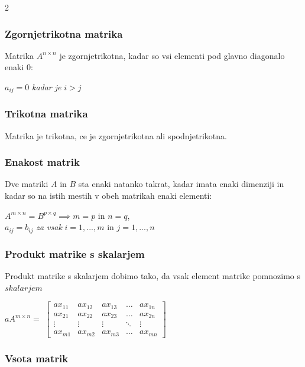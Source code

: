 \documentclass{article}
\begin{document}
\begin{multicols}{2}
	\subsubsection{Zgornjetrikotna matrika}

	Matrika $A^{n \times n}$ je zgornjetrikotna, kadar
	so vsi elementi pod glavno diagonalo enaki 0:
	\begin{center}
		$a_{ij} = 0$  \textit{kadar je} $i > j$
	\end{center}

	\subsubsection{Trikotna matrika}

	Matrika je trikotna, ce je zgornjetrikotna ali spodnjetrikotna.

	\subsubsection{Enakost matrik}

	Dve matriki $A$ in $B$ sta enaki natanko takrat,
	kadar imata enaki dimenziji in kadar so na istih mestih v obeh
	matrikah enaki elementi:
	\begin{center}
		$A^{m \times n} = B^{p \times q} \implies m=p$ in $n=q$,\\
		$a_{ij} = b_{ij}$ \textit{za vsak} $i= 1,...,m$ in $j=1,...,n$
	\end{center}

	\subsubsection{Produkt matrike s skalarjem}

	Produkt matrike s skalarjem dobimo tako, da
	vsak element matrike pomnozimo s $skalarjem$
	\begin{center}
		$aA^{m \times n} =$
		$\begin{bmatrix}
				ax_{11} & ax_{12} & ax_{13} & \dots  & ax_{1n} \\
				ax_{21} & ax_{22} & ax_{23} & \dots  & ax_{2n} \\
				\vdots  & \vdots  & \vdots  & \ddots & \vdots  \\
				ax_{m1} & ax_{m2} & ax_{m3} & \dots  & ax_{mn}
			\end{bmatrix}$
	\end{center}

	\subsubsection{Vsota matrik}


\end{multicols}
\end{document}
